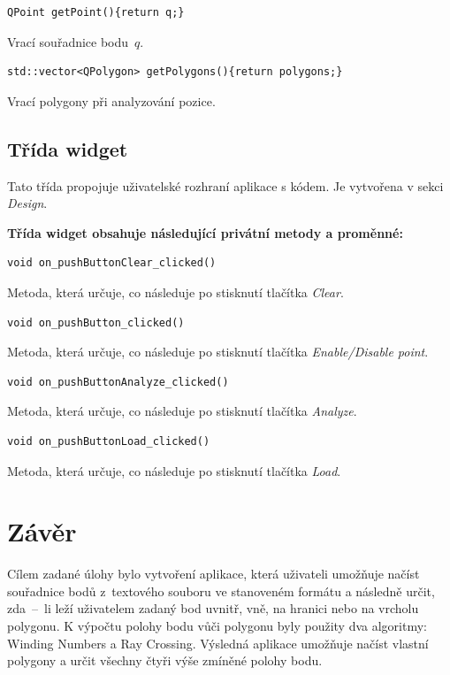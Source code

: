 \documentclass[a4paper, 12pt, oneside, titlepage]{article} %
\begin{document}
\begin{verbatim}
QPoint getPoint(){return q;}
\end{verbatim}
Vrací souřadnice bodu~$q$.\\

\begin{verbatim}
std::vector<QPolygon> getPolygons(){return polygons;}
\end{verbatim}
Vrací polygony při analyzování pozice.\\

\subsection{Třída widget}
Tato třída propojuje uživatelské rozhraní aplikace s kódem. Je vytvořena v sekci \emph{Design}.

\textbf{Třída widget obsahuje následující privátní metody a proměnné:}
\begin{verbatim}
void on_pushButtonClear_clicked()
\end{verbatim}
Metoda, která určuje, co následuje po stisknutí tlačítka \emph{Clear}.\\

\begin{verbatim}
void on_pushButton_clicked()
\end{verbatim}
Metoda, která určuje, co následuje po stisknutí tlačítka \emph{Enable/Disable point}.\\

\begin{verbatim}
void on_pushButtonAnalyze_clicked()
\end{verbatim}
Metoda, která určuje, co následuje po stisknutí tlačítka \emph{Analyze}.\\

\begin{verbatim}
void on_pushButtonLoad_clicked()
\end{verbatim}
Metoda, která určuje, co následuje po stisknutí tlačítka \emph{Load}.\\


\section{Závěr}
Cílem zadané úlohy bylo vytvoření aplikace, která uživateli umožňuje načíst souřadnice bodů z~textového souboru ve stanoveném formátu a následně určit, zda~--~li leží uživatelem zadaný bod uvnitř, vně, na hranici nebo na vrcholu polygonu. K výpočtu polohy bodu vůči polygonu byly použity dva algoritmy: Winding Numbers a Ray Crossing. Výsledná aplikace umožňuje načíst vlastní polygony a určit všechny čtyři výše zmíněné polohy bodu.
\end{document}
